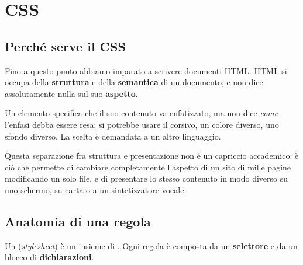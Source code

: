 \chapter{CSS}

\section{Perché serve il CSS}

Fino a questo punto abbiamo imparato a scrivere documenti HTML. HTML si occupa
della \textbf{struttura} e della \textbf{semantica} di un documento, e non dice
assolutamente nulla sul suo \textbf{aspetto}.

Un elemento  specifica che il suo contenuto va enfatizzato, ma non dice
\textit{come} l'enfasi debba essere resa: si potrebbe usare il corsivo, un
colore diverso, uno sfondo diverso. La scelta è demandata a un altro linguaggio.


Questa separazione fra struttura e presentazione non è un capriccio accademico:
è ciò che permette di cambiare completamente l'aspetto di un sito di mille
pagine modificando un solo file, e di presentare lo stesso contenuto in modo
diverso su uno schermo, su carta o a un sintetizzatore vocale.

\section{Anatomia di una regola}

Un  (\textit{stylesheet}) è un insieme di .
Ogni regola è composta da un \textbf{selettore} e da un blocco di
\textbf{dichiarazioni}.

